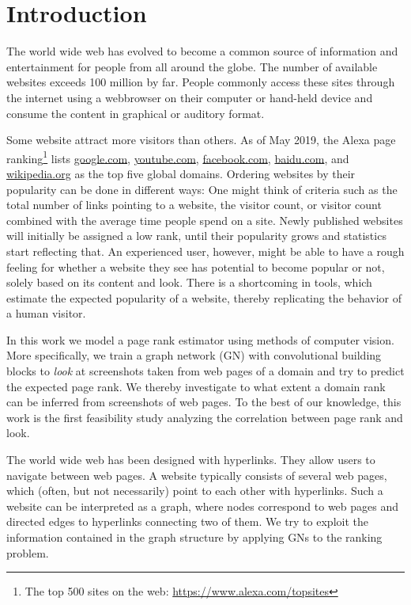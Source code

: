 \section{Introduction}
\label{section:introduction}

The world wide web has evolved to become a common source of information and entertainment for people from all around the globe. The number of available websites exceeds 100 million by far.
People commonly access these sites through the internet using a webbrowser on their computer or hand-held device and consume the content in graphical or auditory format.

Some website attract more visitors than others. As of May 2019, the Alexa page ranking\footnote{The top 500 sites on the web: \url{https://www.alexa.com/topsites}} lists \url{google.com}, \url{youtube.com}, \url{facebook.com}, \url{baidu.com}, and \url{wikipedia.org} as the top five global domains. Ordering websites by their popularity can be done in different ways: One might think of criteria such as the total number of links pointing to a website, the visitor count, or visitor count combined with the average time people spend on a site. Newly published websites will initially be assigned a low rank, until their popularity grows and statistics start reflecting that. An experienced user, however, might be able to have a rough feeling for whether a website they see has potential to become popular or not, solely based on its content and look. There is a shortcoming in tools, which estimate the expected popularity of a website, thereby replicating the behavior of a human visitor.

In this work we model a page rank estimator using methods of computer vision. More specifically, we train a graph network (GN) with convolutional building blocks to \textit{look} at screenshots taken from web pages of a domain and try to predict the expected page rank. We thereby investigate to what extent a domain rank can be inferred from screenshots of web pages. To the best of our knowledge, this work is the first feasibility study analyzing the correlation between page rank and look.

The world wide web has been designed with hyperlinks. They allow users to navigate between web pages. A website typically consists of several web pages, which (often, but not necessarily) point to each other with hyperlinks. Such a website can be interpreted as a graph, where nodes correspond to web pages and directed edges to hyperlinks connecting two of them. We try to exploit the information contained in the graph structure by applying GNs to the ranking problem.


